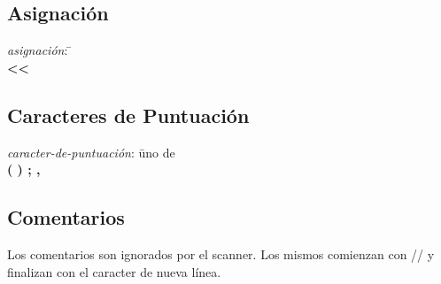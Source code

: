 \subsection{Asignación}

\begin{tabbing}

\textit{asignación}: \= \+ \\
    \textbf{<}\textbf{<}

\end{tabbing}

\subsection{Caracteres de Puntuación}

\begin{tabbing}

\textit{caracter-de-puntuación}: \= uno de \+ \\
    \textbf{
        (
        \hspace{3pt}
        )
        \hspace{3pt}
        ;
        \hspace{3pt}
        ,
    }

\end{tabbing}

\subsection{Comentarios}

Los comentarios son ignorados por el scanner. Los mismos comienzan con // y finalizan con el caracter de nueva línea.
